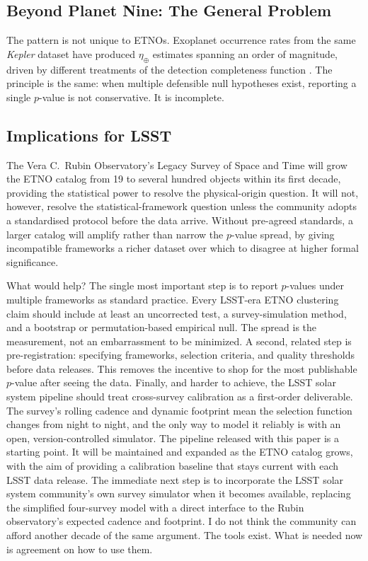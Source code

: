\documentclass[usenatbib]{mnras}
\begin{document}
\subsection{Beyond Planet Nine: The General Problem}

The pattern is not unique to ETNOs. Exoplanet occurrence rates from the same \textit{Kepler} dataset have produced $\eta_\oplus$ estimates spanning an order of magnitude, driven by different treatments of the detection completeness function \cite{bryson2021}. The principle is the same: when multiple defensible null hypotheses exist, reporting a single $p$-value is not conservative. It is incomplete.

\subsection{Implications for LSST}

The Vera C.\ Rubin Observatory's Legacy Survey of Space and Time will grow the ETNO catalog from 19 to several hundred objects within its first decade, providing the statistical power to resolve the physical-origin question. It will not, however, resolve the statistical-framework question unless the community adopts a standardised protocol before the data arrive. Without pre-agreed standards, a larger catalog will amplify rather than narrow the $p$-value spread, by giving incompatible frameworks a richer dataset over which to disagree at higher formal significance.

What would help? The single most important step is to report $p$-values under multiple frameworks as standard practice. Every LSST-era ETNO clustering claim should include at least an uncorrected test, a survey-simulation method, and a bootstrap or permutation-based empirical null. The spread is the measurement, not an embarrassment to be minimized. A second, related step is pre-registration: specifying frameworks, selection criteria, and quality thresholds before data releases. This removes the incentive to shop for the most publishable $p$-value after seeing the data. Finally, and harder to achieve, the LSST solar system pipeline should treat cross-survey calibration as a first-order deliverable. The survey's rolling cadence and dynamic footprint mean the selection function changes from night to night, and the only way to model it reliably is with an open, version-controlled simulator. The pipeline released with this paper is a starting point. It will be maintained and expanded as the ETNO catalog grows, with the aim of providing a calibration baseline that stays current with each LSST data release. The immediate next step is to incorporate the LSST solar system community's own survey simulator when it becomes available, replacing the simplified four-survey model with a direct interface to the Rubin observatory's expected cadence and footprint. I do not think the community can afford another decade of the same argument. The tools exist. What is needed now is agreement on how to use them.
\end{document}
